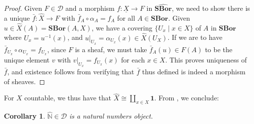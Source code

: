 \documentclass[11pt]{amsart}
\newcommand\cD{\mathcal{D}}
\newcommand\I{^{-1}}
\newcommand{\N}{\mathbb{N}}
\newcommand\rstr[2]{{\left.#1\right|_{#2}}}
\newcommand\SBor{\mathbf{SBor}}
\newcommand\set[2][]{#1\{{#2}#1\}}
\newcommand\tm{\mathbf{1}}
\newcommand\und[1]{\underline{#1}}
\newcommand\wh[1]{\widehat{#1}}
\theoremstyle{definition}
\theoremstyle{remark}
\theoremstyle{plain}
\newtheorem{cor}[defn]{Corollary}
\begin{document}
\begin{proof}
  Given \( F \in \cD \) and a morphism \( f \colon \und{X} \to F \) in \( \wh{\SBor} \), we need to show there is a unique \( \bar f \colon \wh X \to F \) with \( \bar f_A \circ \alpha_A = f_A \) for all \( A \in \SBor \).
  Given \( u \in \wh X(A) = \SBor(A,X) \), we have a covering \( \set{U_x \mid x \in X} \) of \( A \) in \( \SBor \) where \( U_x = u\I(x) \), and \( \rstr{u}{U_x} = \alpha_{U_x}(x) \in \wh X(U_X) \).
  If we are to have \( \bar f_{U_x} \circ \alpha_{U_x} = f_{U_x} \), since \( F \) is a sheaf, we must take \( \bar f_A(u) \in F(A) \) to be the unique element \( v \) with \( \rstr{v}{U_x} = f_{U_x}(x) \) for each \( x \in X \).
  This proves uniqueness of \( \bar f \), and existence follows from verifying that \( \bar f \) thus defined is indeed a morphism of sheaves.
\end{proof}
\noindent
For \( X \) countable, we thus have that \( \wh X \cong \coprod_{x \in X} \tm \).
From \cite[p.~270]{mac-lane-moerdijk}, we conclude:
\begin{cor}\label{cor:nat-is-nat}
  \( \wh{\N} \in \cD \) is a natural numbers object.
\end{cor}
\end{document}

